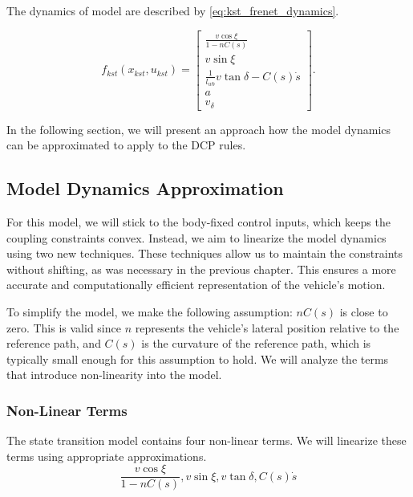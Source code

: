 The dynamics of model are described by \eqref{eq:kst_frenet_dynamics}.

\begin{equation}
	f_{kst}(x_{kst}, u_{kst}) =
	\begin{bmatrix}
		\frac{v \cos\xi}{1 - nC(s)}                \\[8pt]
		v \sin\xi                                  \\[8pt]
		\frac{1}{l_{wb}}v \tan\delta - C(s)\dot{s} \\[8pt]
		a                                          \\[8pt]
		v_\delta
	\end{bmatrix}.
	\label{eq:kst_frenet_dynamics}
\end{equation}

In the following section, we will present an approach how the model dynamics can be approximated to apply to the DCP rules.

\subsection{Model Dynamics Approximation} \label{subsec:approximation_of_model_dynamics}

For this model, we will stick to the body-fixed control inputs, which keeps the coupling constraints convex.
Instead, we aim to linearize the model dynamics using two new techniques.
These techniques allow us to maintain the constraints without shifting, as was necessary in the previous chapter.
This ensures a more accurate and computationally efficient representation of the vehicle's motion.

To simplify the model, we make the following assumption: $nC(s)$ is close to zero.
This is valid since $n$ represents the vehicle's lateral position relative to the reference path, and $C(s)$ is the curvature of the reference path,
which is typically small enough for this assumption to hold.
We will analyze the terms that introduce non-linearity into the model.

\subsubsection{Non-Linear Terms}

The state transition model contains four non-linear terms.
We will linearize these terms using appropriate approximations.
\[
	\frac{v \cos\xi}{1 - nC(s)} ,
	v \sin\xi                   ,
	v \tan\delta                ,
	C(s)\dot{s}
\]

